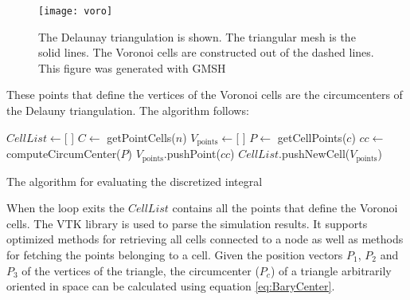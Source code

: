 \begin{figure}[h]
    \centering
    \texttt{[image: voro]}
    \caption{The Delaunay triangulation is shown. The triangular mesh is the solid lines. The Voronoi cells are constructed out of the dashed lines. This figure was generated with GMSH \cite{GMSH}}
    \label{fig:voronoi}
\end{figure}

These points that define the vertices of the Voronoi cells are the circumcenters of the Delauny triangulation. The algorithm follows:

\begin{algorithm}[H]
    \begin{algorithmic}
        \State $ CellList \gets $[ ]
            \State $C \gets $ getPointCells($n$)
            \State $V_{\text{points}} \gets $[ ] 
                \State $P \gets $ getCellPoints($c$)
                \State $cc \gets $ computeCircumCenter($P$)
                \State $V_{\text{points}}$.pushPoint($cc$)
            \EndFor
            \State $CellList$.pushNewCell($V_{\text{points}}$)
        \EndFor
    \end{algorithmic}
    \caption{The algorithm for evaluating the discretized integral}
\end{algorithm}
When the loop exits the $CellList$ contains all the points that define the Voronoi cells. The VTK library is used to parse the simulation results. It supports optimized methods for retrieving all cells connected to a node as well as methods for fetching the points belonging to a cell. Given the position vectors $P_1$, $P_2$ and $P_3$ of the vertices of the triangle, the circumcenter ($P_c$) of a triangle arbitrarily oriented in space can be calculated using equation \ref{eq:BaryCenter}.

